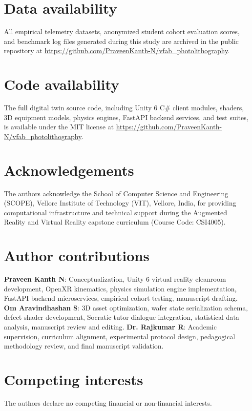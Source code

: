 \documentclass[10pt,a4paper,twocolumn]{article}
\begin{document}
\section*{Data availability}
All empirical telemetry datasets, anonymized student cohort evaluation scores, and benchmark log files generated during this study are archived in the public repository at \url{https://github.com/PraveenKanth-N/vfab_photolithography}.

\section*{Code availability}
The full digital twin source code, including Unity 6 C\# client modules, shaders, 3D equipment models, physics engines, FastAPI backend services, and test suites, is available under the MIT license at \url{https://github.com/PraveenKanth-N/vfab_photolithography}.

\section*{Acknowledgements}
The authors acknowledge the School of Computer Science and Engineering (SCOPE), Vellore Institute of Technology (VIT), Vellore, India, for providing computational infrastructure and technical support during the Augmented Reality and Virtual Reality capstone curriculum (Course Code: CSI4005).

\section*{Author contributions}
\textbf{Praveen Kanth N}: Conceptualization, Unity 6 virtual reality cleanroom development, OpenXR kinematics, physics simulation engine implementation, FastAPI backend microservices, empirical cohort testing, manuscript drafting. \textbf{Om Aravindhashan S}: 3D asset optimization, wafer state serialization schema, defect shader development, Socratic tutor dialogue integration, statistical data analysis, manuscript review and editing. \textbf{Dr. Rajkumar R}: Academic supervision, curriculum alignment, experimental protocol design, pedagogical methodology review, and final manuscript validation.

\section*{Competing interests}
The authors declare no competing financial or non-financial interests.



\end{document}

